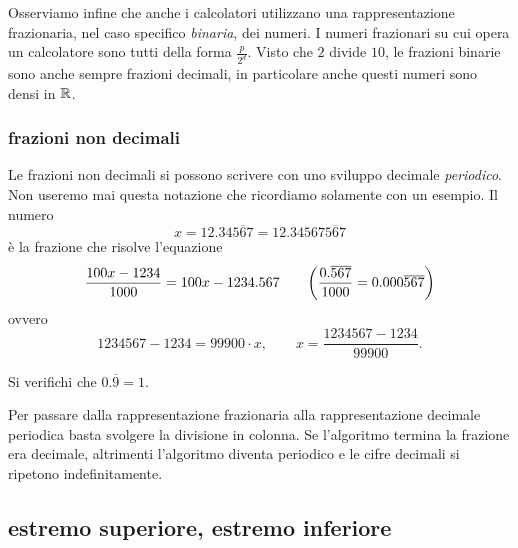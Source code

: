 Osserviamo infine che anche i calcolatori utilizzano una rappresentazione frazionaria, 
nel caso specifico \emph{binaria}, dei numeri.
I numeri frazionari su cui opera un calcolatore sono tutti della forma $\frac{p}{2^d}$.
Visto che $2$ divide $10$, le frazioni binarie sono anche sempre frazioni decimali, 
in particolare anche questi numeri sono densi in ${\mathbb R}$.

\subsubsection{frazioni non decimali}

Le frazioni non decimali si possono scrivere con uno sviluppo
decimale \emph{periodico}. 
Non useremo mai questa notazione
che ricordiamo solamente con un esempio.
Il numero
\[
  x = 12.34\overline{567}
    = 12.34567\overline{567}
\]
è la frazione che risolve l'equazione
\[
  \frac{100x - 1234}{1000}
  = 100x-1234.567
  \qquad
{\left( \frac{0.\overline{567}}{1000}
= 0.000\overline{567}  \right)}
\]
ovvero
\[
  1234567 - 1234 = 99900 \cdot x,
  \qquad x = \frac{1234567-1234}{99900}.
\]

\begin{exercise}
Si verifichi che $0.\overline 9 = 1$.
\end{exercise}
    
Per passare dalla rappresentazione frazionaria alla rappresentazione 
decimale periodica basta svolgere la divisione in colonna.
Se l'algoritmo termina la frazione era decimale, altrimenti l'algoritmo 
diventa periodico e le cifre decimali si ripetono indefinitamente.

\subsection{estremo superiore, estremo inferiore}

